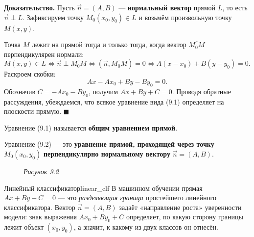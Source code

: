 \documentclass[12pt,a4paper]{article}
\newenvironment{myproof}{\noindent\textbf{Доказательство.}}{\hfill$\blacksquare$}
\begin{document}
\begin{myproof}
  Пусть $\vec{n} = (A, B)$ — \textbf{нормальный вектор} прямой $L$, то есть
  $\vec{n} \perp L$. Зафиксируем точку $M_0(x_0, y_0) \in L$ и возьмём
  произвольную точку $M(x, y)$.

  Точка $M$ лежит на прямой тогда и только тогда, когда вектор
  $\overline{M_0 M}$ перпендикулярен нормали:
  \[
    M(x,y) \in L \iff \vec{n} \perp \overline{M_0 M}
    \iff (\vec{n}, \overline{M_0 M}) = 0
    \iff A(x - x_0) + B(y - y_0) = 0. \tag{9.2}
  \]
  Раскроем скобки:
  \[
    Ax - Ax_0 + By - By_0 = 0.
  \]
  Обозначив $C = -Ax_0 - By_0$, получим $Ax + By + C = 0$.
  Проводя обратные рассуждения, убеждаемся, что всякое уравнение вида (9.1)
  определяет на плоскости прямую.
\end{myproof}

\noindent
Уравнение (9.1) называется \textbf{общим уравнением прямой}.

\noindent
Уравнение (9.2) — это \textbf{уравнение прямой, проходящей через точку}
$M_0(x_0, y_0)$ \textbf{перпендикулярно нормальному вектору}
$\vec{n} = (A, B)$.

\begin{figure}[h!]
  \centering

  \textit{Рисунок 9.2}
\end{figure}

\begin{remarkIT}{Линейный классификатор}{linear_clf}
  В машинном обучении прямая $Ax + By + C = 0$ — это \emph{разделяющая
  граница} простейшего линейного классификатора. Вектор $\vec{n} = (A, B)$
  задаёт «направление роста» уверенности модели: знак выражения
  $Ax_0 + By_0 + C$ определяет, по какую сторону границы лежит объект
  $(x_0, y_0)$, а значит, к какому из двух классов он отнесён.
\end{remarkIT}
\end{document}
